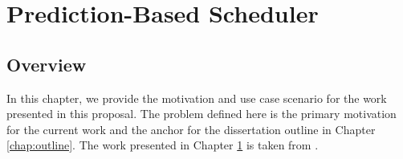 \chapter{Prediction-Based Scheduler}\label{chap:prediction_based_scheduler}

\section{Overview}
\label{pbs:overview}
In this chapter, we provide the motivation and use case scenario for the work presented in this proposal. The problem defined here is the primary motivation for the current work and the anchor for the dissertation outline in Chapter \ref{chap:outline}. The work presented in Chapter \ref{chap:prediction_based_scheduler} is taken from \cite{ravan_ensuring_2020}.






















